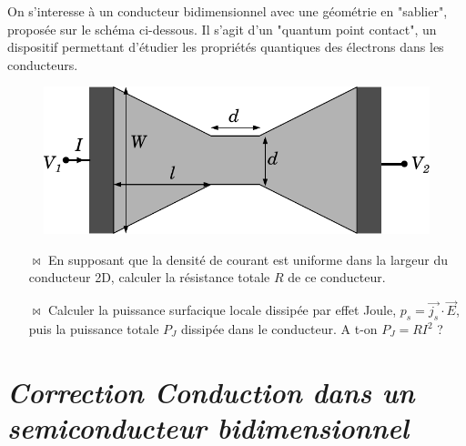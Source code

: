 \documentclass{report}
\begin{document}
On s'interesse à un conducteur bidimensionnel avec une géométrie en "sablier", proposée sur le schéma ci-dessous. Il s'agit d'un "quantum point contact", un dispositif permettant d'étudier les propriétés quantiques des électrons dans les conducteurs.

\begin{figure}[h!]
\centering
		\includegraphics[scale=0.5]{2DEG_QPC.pdf}
\end{figure}

\begin{itemize}

	\item[$\bowtie$] En supposant que la densité de courant est uniforme dans la largeur du conducteur 2D, calculer la résistance totale $R$ de ce conducteur.
	
	\item[$\bowtie$] Calculer la puissance surfacique locale dissipée par effet Joule, $p_s=\vec{j_s}\cdot\vec{E}$, puis la puissance totale $P_J$ dissipée dans le conducteur. A t-on $P_J=RI^2$ ?

\end{itemize}

\newpage

\section*{\textit{Correction Conduction dans un semiconducteur bidimensionnel}}
\end{document}

